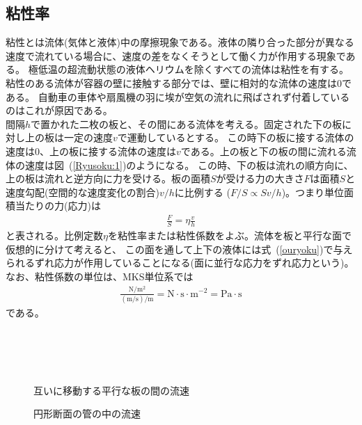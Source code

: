\documentclass[a4j,10pt]{jarticle}
\newcommand{\Equref}[1]{式~(\ref{#1})}
\newcommand{\Figref}[1]{図~(\ref{#1})}
\begin{document}
\subsection{粘性率}
粘性とは流体(気体と液体)中の摩擦現象である。液体の隣り合った部分が異なる速度で流れている場合に、速度の差をなくそうとして働く力が作用する現象である。
極低温の超流動状態の液体ヘリウムを除くすべての流体は粘性を有する。\\
粘性のある流体が容器の壁に接触する部分では、壁に相対的な流体の速度は0である。
自動車の車体や扇風機の羽に埃が空気の流れに飛ばされず付着しているのはこれが原因である。\\
間隔$h$で置かれた二枚の板と、その間にある流体を考える。固定された下の板に対し上の板は一定の速度$v$で運動しているとする。
この時下の板に接する流体の速度は0、上の板に接する流体の速度は$v$である。上の板と下の板の間に流れる流体の速度は\Figref{Ryusoku:1}のようになる。
この時、下の板は流れの順方向に、上の板は流れと逆方向に力を受ける。板の面積$S$が受ける力の大きさ$F$は面積$S$と速度勾配(空間的な速度変化の割合)$v/h$に比例する
($F/S \propto Sv/h$)。つまり単位面積当たりの力(応力)は
\begin{eqnarray}
\label{ouryoku}
\frac{F}{S} = \eta \frac{v}{h}
\end{eqnarray}
と表される。比例定数$\eta$を粘性率または粘性係数をよぶ。流体を板と平行な面で仮想的に分けて考えると、
この面を通して上下の液体には\Equref{ouryoku}で与えられるずれ応力が作用していることになる(面に並行な応力をずれ応力という)。
なお、粘性係数の単位は、MKS単位系では
\begin{eqnarray}
\label{nensei:tanni}
\mathrm {\frac{N/m^{2}}{(m/\mathrm s)/m} = N \cdot s \cdot m^{-2} = Pa \cdot s}
\end{eqnarray}
である。
\\ \\ \\ \\ \
\begin{figure}[h]
\begin{minipage}{.5\hsize}
\caption{互いに移動する平行な板の間の流速}
\label{Ryusoku:1}
\end{minipage}
\begin{minipage}{.5\hsize}
\caption{円形断面の管の中の流速}
\label{Ryusoku:2}
\end{minipage}
\end{figure}
\end{document}
